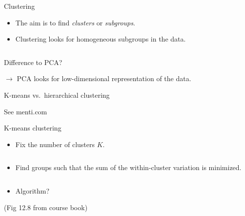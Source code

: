 \documentclass[
  10pt,
  ignorenonframetext,
]{beamer}
\providecommand{\tightlist}{%
  \setlength{\itemsep}{0pt}\setlength{\parskip}{0pt}}
\begin{document}
\begin{frame}{Clustering}
\protect\hypertarget{clustering}{}
\(~\)

\begin{itemize}
\item
  The aim is to find \emph{clusters} or \emph{subgroups}.
\item
  Clustering looks for homogeneous subgroups in the data.
\end{itemize}

\(~\)

Difference to PCA?

\pause

\(\rightarrow\) PCA looks for low-dimensional representation of the
data.
\end{frame}

\begin{frame}
\begin{block}{K-means vs.~hierarchical clustering}
\protect\hypertarget{k-means-vs.-hierarchical-clustering}{}
\(~\)

See menti.com
\end{block}
\end{frame}

\begin{frame}
\begin{block}{K-means clustering}
\protect\hypertarget{k-means-clustering}{}
\(~\)

\begin{itemize}
\tightlist
\item
  Fix the number of clusters \(K\).
\end{itemize}

\(~\)

\begin{itemize}
\tightlist
\item
  Find groups such that the sum of the within-cluster variation is
  minimized.
\end{itemize}

\(~\)

\begin{itemize}
\tightlist
\item
  Algorithm?
\end{itemize}
\end{block}
\end{frame}

\begin{frame}
\end{frame}

\begin{frame}
\centering

\flushleft
\small

(Fig 12.8 from course book)
\end{frame}
\end{document}
